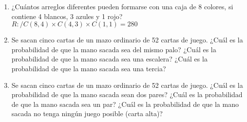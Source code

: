 \documentclass[a4paper, 12pt]{article}
\begin{document}
\begin{enumerate}
    \vspace{0.5cm}
    \item ¿Cuántos arreglos diferentes pueden formarse con una caja de 8 colores, si contiene 4 blancos, 3 azules y 1 rojo?
    \vspace{0.2cm}
    \\ { \color{azul} $R:/ C(8, 4) \times C(4, 3) \times C(1, 1) = 280$ }

\newpage
    \vspace{0.5cm}
    \item Se sacan cinco cartas de un mazo ordinario de 52 cartas de juego. ¿Cuál es la probabilidad de que la mano sacada sea del mismo palo? ¿Cuál es la probabilidad de que la mano sacada sea una escalera? ¿Cuál es la probabilidad de que la mano sacada sea una tercia?


    \vspace{0.5cm}
    \item Se sacan cinco cartas de un mazo ordinario de 52 cartas de juego. ¿Cuál es la probabilidad de que la mano sacada sean dos pares? ¿Cuál es la probabilidad de que la mano sacada sea un par? ¿Cuál es la probabilidad de que la mano sacada no tenga ningún juego posible (carta alta)?
\end{enumerate}
\end{document}

